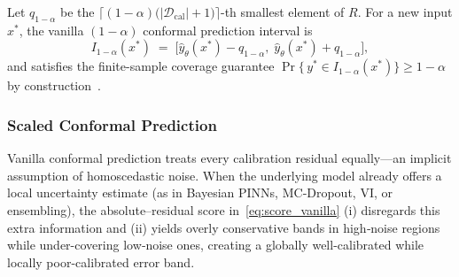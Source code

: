 \documentclass[preprint,12pt]{elsarticle}
\begin{document}
Let $q_{1-\alpha}$ be the
$\lceil (1-\alpha)\bigl(|\mathcal D_{\mathrm{cal}}|+1\bigr)\rceil$-th smallest element of $R$.  
For a new input $x^\ast$, the vanilla $(1-\alpha)$ conformal
prediction interval is
%
\begin{equation}
  I_{1-\alpha}(x^\ast)
  \;=\;
  \bigl[
      \hat y_{\theta}(x^\ast) - q_{1-\alpha},\;
      \hat y_{\theta}(x^\ast) + q_{1-\alpha}
  \bigr],
  \label{eq:vanilla_cp_interval}
\end{equation}
%
and satisfies the finite-sample coverage guarantee
$\Pr\!\bigl\{\,y^\ast\in I_{1-\alpha}(x^\ast)\bigr\}\ge 1-\alpha$ by construction~\cite{angelopoulos_gentle_2022}.

\bigskip
\subsubsection{Scaled Conformal Prediction}
\label{sec:sub:scaled_cp}

Vanilla conformal prediction treats every calibration residual equally—an implicit assumption of homoscedastic noise.
When the underlying model already offers a local uncertainty estimate (as in Bayesian PINNs, MC‐Dropout, VI, or ensembling), the absolute–residual score in~\eqref{eq:score_vanilla} (i) disregards this extra information and (ii) yields overly conservative bands in high‐noise regions while under-covering low‐noise ones, creating a globally well-calibrated while locally poor-calibrated error band.
\end{document}

